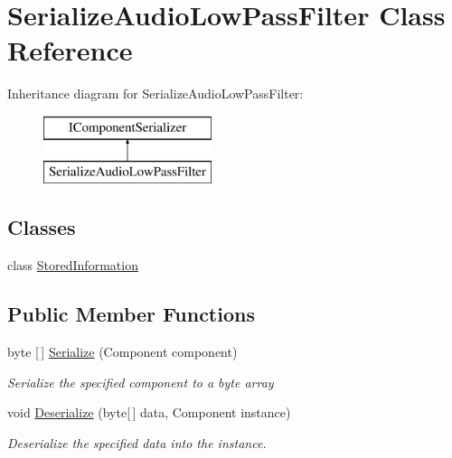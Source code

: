 \hypertarget{class_serialize_audio_low_pass_filter}{}\section{Serialize\+Audio\+Low\+Pass\+Filter Class Reference}
\label{class_serialize_audio_low_pass_filter}
Inheritance diagram for Serialize\+Audio\+Low\+Pass\+Filter\+:\begin{figure}[H]
\begin{center}
\leavevmode
\includegraphics[height=2.000000cm]{class_serialize_audio_low_pass_filter}
\end{center}
\end{figure}
\subsection*{Classes}
\begin{DoxyCompactItemize}
\item 
class \hyperlink{class_serialize_audio_low_pass_filter_1_1_stored_information}{Stored\+Information}
\end{DoxyCompactItemize}
\subsection*{Public Member Functions}
\begin{DoxyCompactItemize}
\item 
byte \mbox{[}$\,$\mbox{]} \hyperlink{class_serialize_audio_low_pass_filter_a3c3f8b730af67936ec7ddc4f318bd1c0}{Serialize} (Component component)
\begin{DoxyCompactList}\small\item\em Serialize the specified component to a byte array \end{DoxyCompactList}\item 
void \hyperlink{class_serialize_audio_low_pass_filter_a041864b6e0b1f1a8bab893b5243ad880}{Deserialize} (byte\mbox{[}$\,$\mbox{]} data, Component instance)
\begin{DoxyCompactList}\small\item\em Deserialize the specified data into the instance. \end{DoxyCompactList}\end{DoxyCompactItemize}



